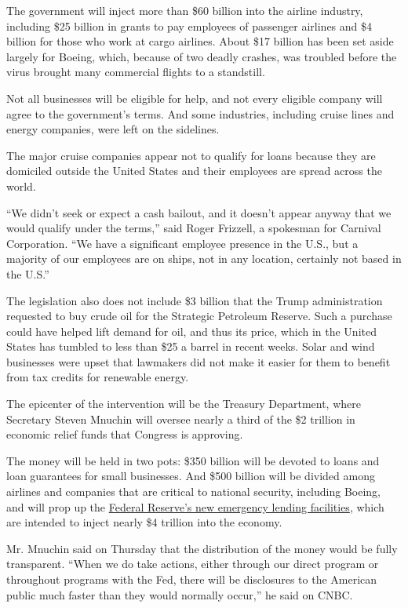 The government will inject more than \$60 billion into the airline
industry, including \$25 billion in grants to pay employees of passenger
airlines and \$4 billion for those who work at cargo airlines. About
\$17 billion has been set aside largely for Boeing, which, because of
two deadly crashes, was troubled before the virus brought many
commercial flights to a standstill.

Not all businesses will be eligible for help, and not every eligible
company will agree to the government's terms. And some industries,
including cruise lines and energy companies, were left on the sidelines.

The major cruise companies appear not to qualify for loans because they
are domiciled outside the United States and their employees are spread
across the world.

``We didn't seek or expect a cash bailout, and it doesn't appear anyway
that we would qualify under the terms,'' said Roger Frizzell, a
spokesman for Carnival Corporation. ``We have a significant employee
presence in the U.S., but a majority of our employees are on ships, not
in any location, certainly not based in the U.S.''

The legislation also does not include \$3 billion that the Trump
administration requested to buy crude oil for the Strategic Petroleum
Reserve. Such a purchase could have helped lift demand for oil, and thus
its price, which in the United States has tumbled to less than \$25 a
barrel in recent weeks. Solar and wind businesses were upset that
lawmakers did not make it easier for them to benefit from tax credits
for renewable energy.

The epicenter of the intervention will be the Treasury Department, where
Secretary Steven Mnuchin will oversee nearly a third of the \$2 trillion
in economic relief funds that Congress is approving.

The money will be held in two pots: \$350 billion will be devoted to
loans and loan guarantees for small businesses. And \$500 billion will
be divided among airlines and companies that are critical to national
security, including Boeing, and will prop up the
\href{https://www.nytimes3xbfgragh.onion/2020/03/26/business/economy/fed-coronavirus-stimulus.html}{Federal
Reserve's new emergency lending facilities}, which are intended to
inject nearly \$4 trillion into the economy.

Mr. Mnuchin said on Thursday that the distribution of the money would be
fully transparent. ``When we do take actions, either through our direct
program or throughout programs with the Fed, there will be disclosures
to the American public much faster than they would normally occur,'' he
said on CNBC.

